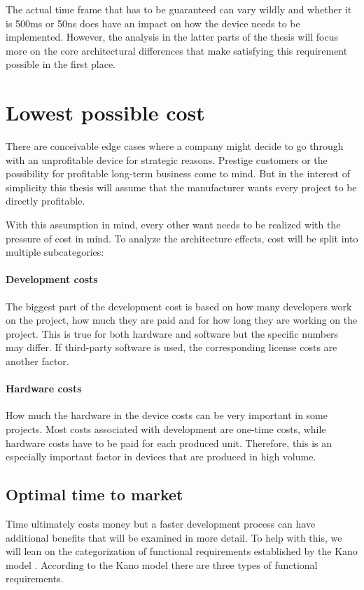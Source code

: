 The actual time frame that has to be guaranteed can vary wildly and whether it is 500ms or 50ns does have an impact on how the device needs to be implemented. However, the analysis in the latter parts of the thesis will focus more on the core architectural differences that make satisfying this requirement possible in the first place. 

\section{Lowest possible cost}
There are conceivable edge cases where a company might decide to go through with an unprofitable device for strategic reasons. Prestige customers or the possibility for profitable long-term business come to  mind. But in the interest of simplicity this thesis will assume that the manufacturer wants every project to be directly profitable.

With this assumption in mind, every other want needs to be realized with the pressure of cost in mind. To analyze the architecture effects, cost will be split into multiple subcategories:
\paragraph{Development costs}
The biggest part of the development cost is based on how many developers work on the project, how  much they are paid and for how long they are working on the project. This is true for both hardware and software but the specific numbers may differ. If third-party software is used, the corresponding license costs are another factor. 
\paragraph{Hardware costs}
How much the hardware in the device costs can be very important in some projects. Most costs associated with development are one-time costs, while hardware costs have to be paid for each produced unit. Therefore, this is an especially important factor in devices that are produced in high volume.

\subsection{Optimal time to market \label{optimal-ttm}}
Time ultimately costs money but a faster development process can have additional benefits that will be examined in more detail. To help with this, we will lean on the categorization of functional requirements established by the Kano model \cite{KanoNoriaki.1984}\cite{ElmarSauerwein.1996}. According to the Kano model there are three types of functional requirements.
